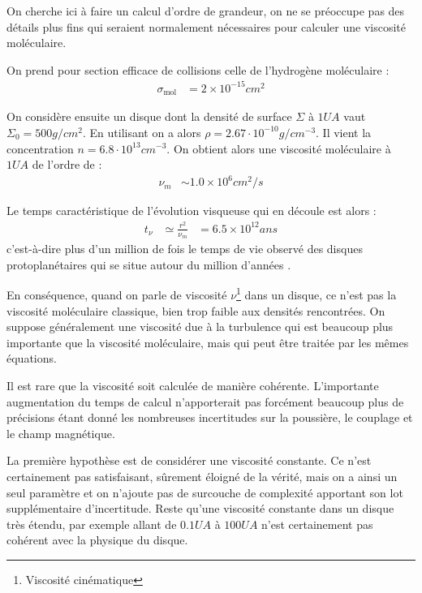 On cherche ici à faire un calcul d'ordre de grandeur, on ne se préoccupe pas des détails plus fins qui seraient normalement nécessaires pour calculer une viscosité moléculaire. 

On prend pour section efficace de collisions celle de l'hydrogène moléculaire \citep{chapman1970mathematical} :
\begin{align}
\sigma_\text{mol} &= 2\times 10^{-15}\unit{cm^2}
\end{align}

On considère ensuite un disque dont la densité de surface $\Sigma$ à $1\unit{UA}$ vaut $\Sigma_0 = 500\unit{g/cm^2}$. En utilisant  on a alors $\rho=2.67\cdot 10^{-10}\unit{g/cm^{-3}}$. Il vient la concentration $n=6.8\cdot 10^{13}\unit{cm^{-3}}$. On obtient alors une viscosité moléculaire à $1\unit{UA}$ de l'ordre de : 
\begin{align}
\nu_m &\sim 1.0\times 10^6\unit{cm^2/s}
\end{align}

Le temps caractéristique de l'évolution visqueuse qui en découle est alors : 
\begin{align}
t_\nu &\simeq \frac{r^2}{\nu_m} &= 6.5\times 10^{12}\unit{ans}
\end{align}
c'est-à-dire plus d'un million de fois le temps de vie observé des disques protoplanétaires qui se situe autour du million d'années \citep{williams2011protoplanetary}.

En conséquence, quand on parle de viscosité $\nu$\footnote{Viscosité cinématique} dans un disque, ce n'est pas la viscosité moléculaire classique, bien trop faible aux densités rencontrées. On suppose généralement une viscosité due à la turbulence qui est beaucoup plus importante que la viscosité moléculaire, mais qui peut être traitée par les mêmes équations. 


Il est rare que la viscosité soit calculée de manière cohérente. L'importante augmentation du temps de calcul n'apporterait pas forcément beaucoup plus de précisions étant donné les nombreuses incertitudes sur la poussière, le couplage et le champ magnétique. 

\bigskip

La première hypothèse est de considérer une viscosité constante. Ce n'est certainement pas satisfaisant, sûrement éloigné de la vérité, mais on a ainsi un seul paramètre et on n'ajoute pas de surcouche de complexité apportant son lot supplémentaire d'incertitude. Reste qu'une viscosité constante dans un disque très étendu, par exemple allant de $0.1\unit{UA}$ à $100\unit{UA}$ n'est certainement pas cohérent avec la physique du disque. 

